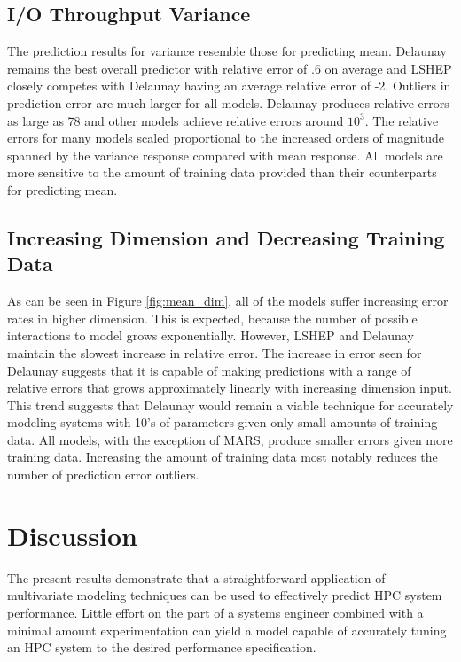 \documentclass{scspaperproc}
\theoremstyle{scsthe}
\begin{document}
\subsection{I/O Throughput Variance}

The prediction results for variance resemble those for predicting
mean. Delaunay remains the best overall predictor with relative error
of .6 on average and LSHEP closely competes with Delaunay having an
average relative error of -2. Outliers in prediction error are much
larger for all models. Delaunay produces relative errors as large as
78 and other models achieve relative errors around $10^3$. The
relative errors for many models scaled proportional to the increased
orders of magnitude spanned by the variance response compared with
mean response. All models are more sensitive to the amount of training
data provided than their counterparts for predicting mean.

\subsection{Increasing Dimension and Decreasing Training Data}

As can be seen in Figure \ref{fig:mean_dim}, all of the models suffer
increasing error rates in higher dimension. This is expected, because
the number of possible interactions to model grows
exponentially. However, LSHEP and Delaunay maintain the slowest
increase in relative error. The increase in error seen for Delaunay
suggests that it is capable of making predictions with a range of
relative errors that grows approximately linearly with increasing
dimension input. This trend suggests that Delaunay would remain a
viable technique for accurately modeling systems with 10's of
parameters given only small amounts of training data. All models, with
the exception of MARS, produce smaller errors given more training
data. Increasing the amount of training data most notably reduces the
number of prediction error outliers.

\section{Discussion}
\label{sec:discussion}

The present results demonstrate that a straightforward application of
multivariate modeling techniques can be used to effectively predict
HPC system performance. Little effort on the part of a systems
engineer combined with a minimal amount experimentation can yield a
model capable of accurately tuning an HPC system to the desired
performance specification.
\end{document}

